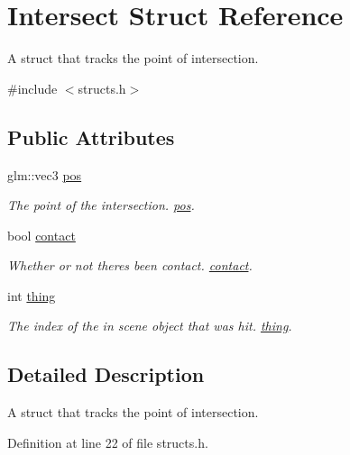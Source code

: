 \hypertarget{struct_intersect}{}\section{Intersect Struct Reference}
\label{struct_intersect}


A struct that tracks the point of intersection.  




{\ttfamily \#include $<$structs.\+h$>$}

\subsection*{Public Attributes}
\begin{DoxyCompactItemize}
\item 
glm\+::vec3 \mbox{\hyperlink{struct_intersect_acac3d72036e36079b68fdfecf071785c}{pos}}
\begin{DoxyCompactList}\small\item\em The point of the intersection. \mbox{\hyperlink{struct_intersect_acac3d72036e36079b68fdfecf071785c}{pos}}. \end{DoxyCompactList}\item 
bool \mbox{\hyperlink{struct_intersect_a804dc874077e6140a02aeddcfa992892}{contact}}
\begin{DoxyCompactList}\small\item\em Whether or not there\textquotesingle{}s been contact. \mbox{\hyperlink{struct_intersect_a804dc874077e6140a02aeddcfa992892}{contact}}. \end{DoxyCompactList}\item 
int \mbox{\hyperlink{struct_intersect_a0db00f51f704942fd24de64379a74c28}{thing}}
\begin{DoxyCompactList}\small\item\em The index of the in scene object that was hit. \mbox{\hyperlink{struct_intersect_a0db00f51f704942fd24de64379a74c28}{thing}}. \end{DoxyCompactList}\end{DoxyCompactItemize}


\subsection{Detailed Description}
A struct that tracks the point of intersection. 

Definition at line 22 of file structs.\+h.



